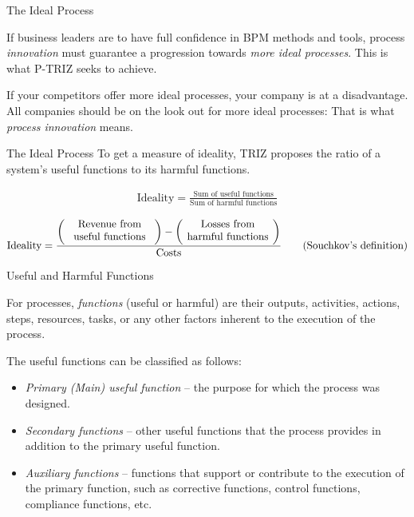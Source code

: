 \documentclass{beamer}
\begin{document}
\begin{frame}{The Ideal Process}

If business leaders are to have full confidence in BPM methods and tools,
process \emph{innovation} must guarantee a progression towards \emph{more
  ideal processes}. This is what P-TRIZ seeks to achieve.

If your competitors offer more ideal processes, your company is at a
disadvantage. All companies should be on the look out for more ideal
processes: That is what \emph{process innovation} means.
\end{frame}

\begin{frame}{The Ideal Process}
To get a measure of ideality, TRIZ proposes the ratio of a system’s useful
functions to its harmful functions.

\begin{gather*}
  \text{Ideality}=\frac{\text{Sum of useful functions}}{\text{Sum of harmful
      functions}} \tag{Smith' definition}
\end{gather*}

\begin{gather*}
  \text{Ideality}=\frac{\left(\parbox{3cm}{\centering Revenue from useful
      functions\vskip4pt}\right) - \left(\parbox{3cm}{\centering Losses from
      harmful functions\vskip4pt}\right)}{\text{Costs}} \tag{Souchkov's
    definition}
\end{gather*}
\end{frame}

\begin{frame}{Useful and Harmful Functions}

For processes, \emph{functions} (useful or harmful) are their outputs,
activities, actions, steps, resources, tasks, or any other factors inherent to
the execution of the process.

The useful functions can be classified as follows:
\begin{itemize}
\item \emph{Primary (Main) useful function} – the purpose for which the
  process was designed.
\item \emph{Secondary functions} – other useful functions that the process
  provides in addition to the primary useful function.
\item \emph{Auxiliary functions} – functions that support or contribute to the
  execution of the primary function, such as corrective functions, control
  functions, compliance functions, etc.
\end{itemize}
\end{frame}
\end{document}
